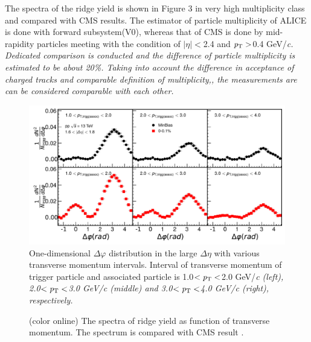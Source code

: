 The spectra of the ridge yield is shown in Figure 3 in very high multiplicity class and compared with CMS results. The estimator of particle multiplicity of ALICE is done with forward subsystem(V0), whereas that of CMS is done by mid-rapidity particles meeting with the condition of $|\eta|<$2.4 and $\it{p}_{\rm{T}}>$0.4 GeV/\it{c}\rm{}. Dedicated comparison is conducted and the difference of particle multiplicity is estimated to be about 20\%. Taking into account the difference in acceptance of charged tracks and comparable definition of multiplicity,, the measurements are can be considered comparable with each other.


\begin{figure}[h!]
	\centering
	\includegraphics[width=0.99\linewidth]{./figures/Fig2_PlotDeltaPhi.pdf}
	\caption{One-dimensional $\Delta\varphi$ distribution in the large $\Delta\eta$ with various transverse momentum intervals. Interval of transverse momentum of trigger particle and associated particle is 1.0$<\it{p}_{\rm{T}}<$2.0 GeV/\it{c}\rm{} (left), 2.0$<\it{p}_{\rm{T}}<$3.0 GeV/\it{c}\rm{} (middle) and 3.0$<\it{p}_{\rm{T}}<$4.0 GeV/\it{c}\rm{} (right), respectively. }
	\label{fig:PlotDeltaPhi}
\end{figure}
 
\begin{figure}
	\centering
	\caption{(color online) The spectra of ridge yield as function of transverse momentum. The spectrum is compared with CMS result \cite{ridge_pp_1}.}
\end{figure}


